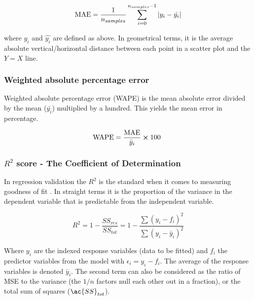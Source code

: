 \begin{align}\label{eq:MAE}
\text{MAE} = \frac{1}{n_{samples}}\sum^{n_{samples}-1}_{i=0}\abs{y_i - \hat{y_i}}
\end{align}

where $y_i$ and $\hat{y_i}$ are defined as above. In geometrical terms, it is the average absolute vertical/horizontal distance between each point in a scatter plot and the $Y=X$ line.

\subsubsection{Weighted absolute percentage error}

Weighted absolute percentage error (\ac{WAPE}) is the mean absolute error divided by the mean ($\bar{y_i}$) multiplied by a hundred. This yields the mean error in percentage.

\begin{align}\label{eq:WAPE}
\text{WAPE} = \frac{\text{MAE}}{\bar{y}_{i}} \cross 100 
\end{align}



\subsubsection{$R^2$ score - The Coefficient of Determination}

	In regression validation the $R^2$ is the standard when it comes to measuring goodness of fit \cite{james2013introduction}. In straight terms it is the proportion of the variance in the dependent variable that is predictable from the independent variable.

\begin{equation}\label{eq: R squared}
	R^2 =1 - \frac{SS_{res}}{SS_{tot}} =  1 - \frac{ \sum(y_i-f_i)^2 }{ \sum(y_i-\bar{y}_i)^2 }
\end{equation}

	Where $y_i$ are the indexed response variables (data  to be fitted) and $f_i$ the predictor variables from the model with $\epsilon_i = y_i - f_i$. The average of the response variables is denoted $\bar{y}_i$. The second term can also be considered as the ratio of MSE to the variance (the $1/n$ factors null each other out in a fraction), or the total sum of squares ($\ac{SS}_{tot}$).
	
